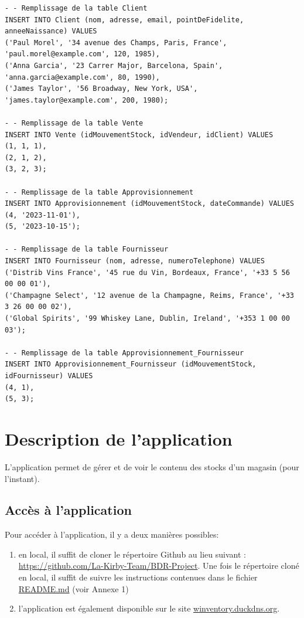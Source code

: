 \documentclass[12pt]{report}
\begin{document}
\begin{lstlisting}[breaklines=true]
- - Remplissage de la table Client
INSERT INTO Client (nom, adresse, email, pointDeFidelite, anneeNaissance) VALUES
('Paul Morel', '34 avenue des Champs, Paris, France', 'paul.morel@example.com', 120, 1985),
('Anna Garcia', '23 Carrer Major, Barcelona, Spain', 'anna.garcia@example.com', 80, 1990),
('James Taylor', '56 Broadway, New York, USA', 'james.taylor@example.com', 200, 1980);

- - Remplissage de la table Vente
INSERT INTO Vente (idMouvementStock, idVendeur, idClient) VALUES
(1, 1, 1),
(2, 1, 2),
(3, 2, 3);

- - Remplissage de la table Approvisionnement
INSERT INTO Approvisionnement (idMouvementStock, dateCommande) VALUES
(4, '2023-11-01'),
(5, '2023-10-15');

- - Remplissage de la table Fournisseur
INSERT INTO Fournisseur (nom, adresse, numeroTelephone) VALUES
('Distrib Vins France', '45 rue du Vin, Bordeaux, France', '+33 5 56 00 00 01'),
('Champagne Select', '12 avenue de la Champagne, Reims, France', '+33 3 26 00 00 02'),
('Global Spirits', '99 Whiskey Lane, Dublin, Ireland', '+353 1 00 00 03');

- - Remplissage de la table Approvisionnement_Fournisseur
INSERT INTO Approvisionnement_Fournisseur (idMouvementStock, idFournisseur) VALUES
(4, 1),
(5, 3);
    \end{lstlisting}


    \section*{Description de l'application}
    L'application permet de gérer et de voir le contenu des stocks d'un magasin (pour l'instant).
    \newline
    \subsection*{Accès à l'application}
    Pour accéder à l'application, il y a deux manières possibles:
    \begin{enumerate}
        \item en local, il suffit de cloner le répertoire Github au lieu suivant : \href{https://github.com/La-Kirby-Team/BDR-Project}{https://github.com/La-Kirby-Team/BDR-Project}.
        \newline Une fois le répertoire cloné en local, il suffit de suivre les instructions contenues dans le fichier \href{https://github.com/La-Kirby-Team/BDR-Project/blob/main/README.md}{README.md} (voir Annexe 1)
        \item l'application est également disponible sur le site \href{winventory.duckdns.org}{winventory.duckdns.org}.
    \end{enumerate}
\end{document}
